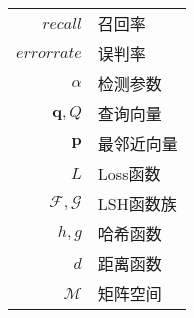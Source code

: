 \begin{nomenclaturename}
\label{chap:symb}

\begin{longtable}{rl}
$recall$     & 召回率 \\
$errorrate$  & 误判率 \\
$\alpha$	 & 检测参数 \\
$\mathbf{q},Q$ & 查询向量 \\
$\mathbf{p}$ & 最邻近向量 \\
$L$			 & Loss函数 \\
$\mathcal{F},\mathcal{G}$ & LSH函数族 \\
$h,g$ 		 & 哈希函数 \\
$d$			 & 距离函数 \\
$\mathcal{M}$& 矩阵空间 


\end{longtable}

\end{nomenclaturename}
